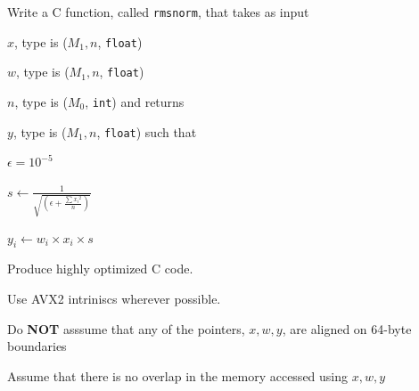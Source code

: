 \documentclass[letterpaper,12pt]{article}
\begin{document}



Write a C function, called {\tt rmsnorm}, that takes as input
\be
\item \(x\), type is (\(M_1, n\), {\tt float})
\item \(w\), type is (\(M_1, n\), {\tt float})
\item \(n\), type is (\(M_0\), {\tt int})
\ee
and returns 
\be
\item \(y\), type is (\(M_1, n\), {\tt float})
\ee
such that 
\be
\item \(\epsilon = 10^{-5}\) 
\item \(s \leftarrow \frac{1}{\sqrt{(\epsilon + \frac{\sum {x_i}^2}{n})}}\) 
\item \(y_i \leftarrow w_i \times x_i \times s\) \\ 
  \ee

  \be
\item Produce highly optimized C code.
\item Use AVX2 intriniscs wherever possible.
\item Do {\bf NOT} asssume that any of the pointers, \(x, w, y\), are aligned on 64-byte boundaries
\item Assume that there is no overlap in the memory accessed using \(x, w, y\)
  \ee
\end{document}
